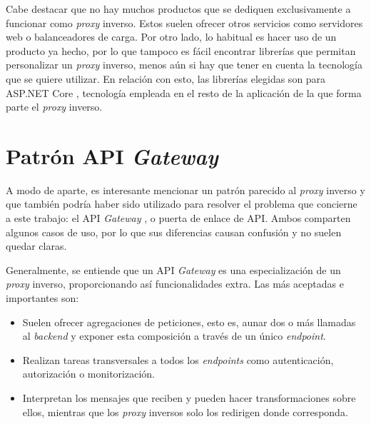 \documentclass[11pt,spanish,listoffigures]{tfgetsinf}
\begin{document}
Cabe destacar que no hay muchos productos que se dediquen exclusivamente a funcionar como \emph{proxy} inverso. Estos suelen ofrecer otros servicios como servidores web o balanceadores de carga. Por otro lado, lo habitual es hacer uso de un producto ya hecho, por lo que tampoco es fácil encontrar librerías que permitan personalizar un \emph{proxy} inverso, menos aún si hay que tener en cuenta la tecnología que se quiere utilizar. En relación con esto, las librerías elegidas son para ASP.NET Core \cite{DotNetCore}, tecnología empleada en el resto de la aplicación de la que forma parte el \emph{proxy} inverso.


	\section{Patrón API \emph{Gateway}} \label{APIGateway}

A modo de aparte, es interesante mencionar un patrón parecido al \emph{proxy} inverso y que también podría haber sido utilizado para resolver el problema que concierne a este trabajo: el API \emph{Gateway} \cite{ApiGateway}, o puerta de enlace de API. Ambos comparten algunos casos de uso, por lo que sus diferencias causan confusión y no suelen quedar claras.

Generalmente, se entiende que un API \emph{Gateway} es una especialización de un \emph{proxy} inverso, proporcionando así funcionalidades extra. Las más aceptadas e importantes son:

\begin{itemize}
	
	\item Suelen ofrecer agregaciones de peticiones, esto es, aunar dos o más llamadas al \emph{backend} y exponer esta composición a través de un único \emph{endpoint}.
	
	\item Realizan tareas transversales a todos los \emph{endpoints} como autenticación, autorización o monitorización.

	\item Interpretan los mensajes que reciben y pueden hacer transformaciones sobre ellos, mientras que los \emph{proxy} inversos solo los redirigen donde corresponda.

\end{itemize}

\end{document}
